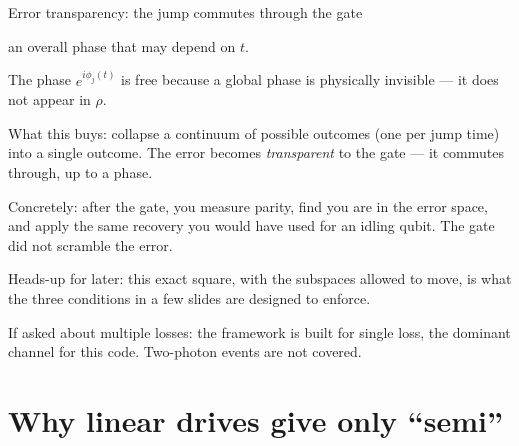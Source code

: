 \begin{frame}{Error transparency: the jump commutes through the gate}
{\begin{ntitem}
            an overall phase that may depend on $t$.
      \item The phase $e^{i\phi_j(t)}$ is free because a global phase is physically
            invisible --- it does not appear in $\rho$.
      \item What this buys: collapse a continuum of possible outcomes (one per jump time)
            into a single outcome. The error becomes \emph{transparent} to the gate --- it
            commutes through, up to a phase.
      \item Concretely: after the gate, you measure parity, find you are in the error space,
            and apply the same recovery you would have used for an idling qubit. The gate
            did not scramble the error.
      \item Heads-up for later: this exact square, with the subspaces allowed to move, is what
            the three conditions in a few slides are designed to enforce.
      \item If asked about multiple losses: the framework is built for single loss, the
            dominant channel for this code. Two-photon events are not covered.
    \end{ntitem}}
\end{frame}

\section[Why only ``semi'']{Why linear drives give only ``semi''}

